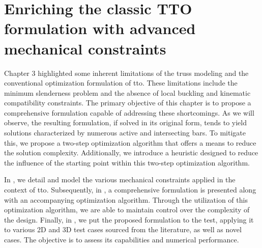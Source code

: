 \setchapterpreamble[u]{\margintoc}
\glsresetall %
\chapter{Enriching the classic TTO formulation with advanced mechanical constraints}

Chapter 3 highlighted some inherent limitations of the truss modeling and the conventional optimization formulation of \gls{tto}. These limitations include the minimum slenderness problem and the absence of local buckling and kinematic compatibility constraints. The primary objective of this chapter is to propose a comprehensive formulation capable of addressing these shortcomings. As we will observe, the resulting formulation, if solved in its original form, tends to yield solutions characterized by numerous active and intersecting bars. To mitigate this, we propose a two-step optimization algorithm that offers a means to reduce the solution complexity. Additionally, we introduce a heuristic designed to reduce the influence of the starting point within this two-step optimization algorithm. 

In , we detail and model the various mechanical constraints applied in the context of \gls{tto}. Subsequently, in , a comprehensive formulation is presented along with an accompanying optimization algorithm. Through the utilization of this optimization algorithm, we are able to maintain control over the complexity of the design. Finally, in , we put the proposed formulation to the test, applying it to various 2D and 3D test cases sourced from the literature, as well as novel cases. The objective is to assess its capabilities and numerical performance.


